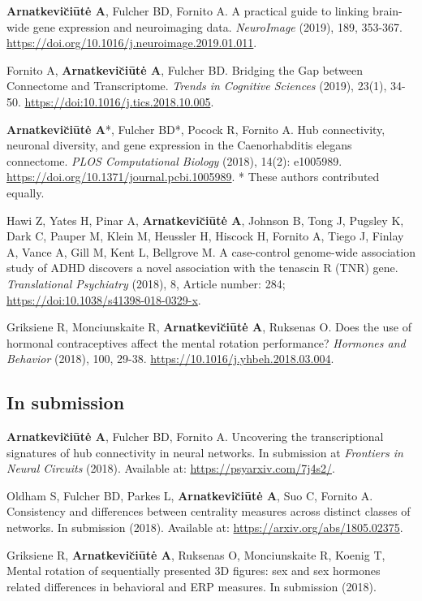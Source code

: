 \vspace*{20mm}
\vspace{10mm}

\textbf{Arnatkevi\u{c}i\={u}t\.{e} A}, Fulcher BD, Fornito A. A practical guide to linking brain-wide gene expression and neuroimaging data. \textit{NeuroImage} (2019), 189, 353-367. \url{https://doi.org/10.1016/j.neuroimage.2019.01.011}.

Fornito A, \textbf{Arnatkevi\u{c}i\={u}t\.{e} A}, Fulcher BD. Bridging the Gap between Connectome and Transcriptome. \textit{Trends in Cognitive Sciences} (2019), 23(1), 34-50. \url{https://doi:10.1016/j.tics.2018.10.005}.

\textbf{Arnatkevi\u{c}i\={u}t\.{e} A}*, Fulcher BD*, Pocock R, Fornito A. Hub connectivity, neuronal diversity, and gene expression in the Caenorhabditis elegans connectome. \textit{PLOS Computational Biology} (2018), 14(2): e1005989. \url{https://doi.org/10.1371/journal.pcbi.1005989}. * These authors contributed equally.

Hawi Z, Yates H, Pinar A, \textbf{Arnatkevi\u{c}i\={u}t\.{e} A}, Johnson B, Tong J, Pugsley K, Dark C, Pauper M, Klein M, Heussler H, Hiscock H, Fornito A, Tiego J, Finlay A, Vance A, Gill M, Kent L, Bellgrove M. A case-control genome-wide association study of ADHD discovers a novel association with the tenascin R (TNR) gene. \textit{Translational Psychiatry} (2018), 8, Article number: 284; \url{https://doi:10.1038/s41398-018-0329-x}.

Griksiene R, Monciunskaite R, \textbf{Arnatkevi\u{c}i\={u}t\.{e} A}, Ruksenas O. Does the use of hormonal contraceptives affect the mental rotation performance? \textit{Hormones and Behavior} (2018), 100, 29-38. \url{https://10.1016/j.yhbeh.2018.03.004}.

\subsection*{In submission}

\textbf{Arnatkevi\u{c}i\={u}t\.{e} A}, Fulcher BD, Fornito A. Uncovering the transcriptional signatures of hub connectivity in neural networks. In submission at \textit{Frontiers in Neural Circuits} (2018). Available at: \url{https://psyarxiv.com/7j4s2/}.
 
Oldham S, Fulcher BD, Parkes L, \textbf{Arnatkevi\u{c}i\={u}t\.{e} A}, Suo C, Fornito A. Consistency and differences between centrality measures across distinct classes of networks. In submission (2018). Available at: \url{https://arxiv.org/abs/1805.02375}.

Griksiene R, \textbf{Arnatkevi\u{c}i\={u}t\.{e} A}, Ruksenas O, Monciunskaite R, Koenig T, Mental rotation of sequentially presented 3D figures: sex and sex hormones related differences in behavioral and ERP measures. In submission (2018). 

\vspace{3mm}

